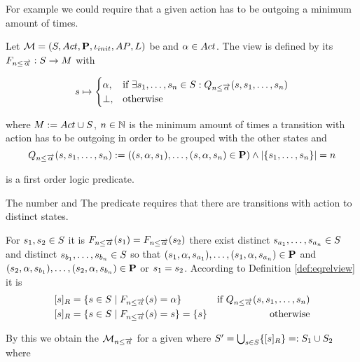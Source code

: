 \documentclass[preview]{standalone}
\begin{document}
For example we could require that a given action has to be outgoing a minimum amount of times. 

\begin{definition}
	Let ${{{\mathcal{M}}}} = {{({S}, {Act}, {\textbf{P}}, {\iota_{init}}, {AP}, {L})}}$ be \chosengraphtypeN and ${\alpha} \in {Act}$. The view \viewminoutaction is defined by its \grpfctN ${{F_{{n}\leq{\overrightarrow{\ensuremath{{\alpha}}}}}}} : {S} \to {M}$ with
	
	\[
	{s} \mapsto
	\begin{cases}
		{\alpha},				& \text{if } \exists {s}_1, \dots, {s}_{n} \in {S}:  {Q_{{n}\leq{\overrightarrow{\ensuremath{{\alpha}}}}}({s},{s}_1, \dots, {s}_{{n}})}\\
		{\bot},          	& \text{otherwise}
	\end{cases}
	\]
	
	where ${{M}} := {{Act} \cup {S}}$, ${n} \in {\mathbb{N}}$ is the minimum amount of times a transition with action \action has to be outgoing in order to be grouped with the other states and
	\[
	{Q_{{n}\leq{\overrightarrow{\ensuremath{{\alpha}}}}}({s},{s}_1, \dots, {s}_{{n}})} := (({s}, {\alpha}, {s}_1), \dots, ({s}, {\alpha}, {s}_{n}) \in {\ensuremath{{\textbf{P}}}}) \land |\{{s}_1, \dots, {s}_{n}\}| = {n}
	\]
	
	is a first order logic predicate.
	\label{def:minoutaction}
\end{definition}

The number  and  
The predicate \predminoutact requires that there are transitions with action \action to \numoutact distinct states.

For ${s}_1,{s}_2 \in {S}$ it is ${{F_{{n}\leq{\overrightarrow{\ensuremath{{\alpha}}}}}}}({s}_1) = {{F_{{n}\leq{\overrightarrow{\ensuremath{{\alpha}}}}}}}({s}_2)$ \iffN there exist distinct ${s}_{a_1}, \dots, {s}_{a_{n}} \in {S}$ and distinct ${s}_{b_1}, \dots, {s}_{b_{n}} \in {S}$ so that $({s}_1, {\alpha}, {s}_{a_1}), \dots, ({s}_1, {\alpha}, {s}_{a_{n}}) \in {\ensuremath{{\textbf{P}}}}$ and $({s}_2, {\alpha}, {s}_{b_1}), \dots, ({s}_2, {\alpha}, {s}_{b_{n}}) \in {\ensuremath{{\textbf{P}}}}$ or ${s}_1 = {s}_2$. According to Definition \ref{def:eqrelview} it is 
\begin{align*}
	\eqclassv &= \{\state \in \states \mid \gfctminoutaction(\state) = \action\} &\text{if } \predminoutact \\ 
	\eqclassv &= \{\state \in \states \mid \gfctminoutaction(\state) = \state\} = \{\state\} &\text{ otherwise}
\end{align*}

By this we obtain the \viewN ${{{{{\mathcal{M}}}}_{{n}\leq{\overrightarrow{\ensuremath{{\alpha}}}}}}}$ for a given \chosengraphtypeN \chgph where ${S}' = \bigcup_{{s} \in {S}} \{{{[{s}]_{{R}}}}\} =: {S}_1 \cup {S}_2$ where 
\end{document}
